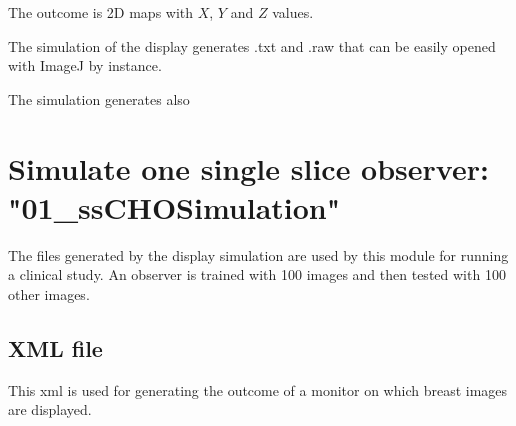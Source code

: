 The outcome is 2D maps with $X$, $Y$ and $Z$ values.

The simulation of the display generates .txt and .raw that can be easily opened with ImageJ by instance.

The simulation generates also 

\section{Simulate one single slice observer: "01\_ssCHOSimulation"}

The files generated by the display simulation are used by this module for running a clinical study. An observer is trained with 100 images and then tested with 100 other images.

\subsection{XML file}

This xml is used for generating the outcome of a monitor on which breast images are displayed.

